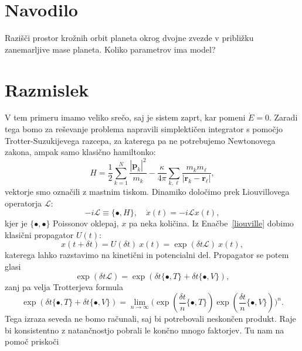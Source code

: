\documentclass[12pt, a4paper]{article}
\renewcommand{\r}{
    \ensuremath{\mathbf{r}}
}
\newcommand{\p}{
    \ensuremath{\mathbf{p}}
}
\renewcommand{\L}{
    \ensuremath{\mathcal{L}}
}
\newcommand{\sfrac}[2]{
    \ensuremath{\textstyle{\frac{#1}{#2}}}
}
\begin{document}
\section{Navodilo}

Razi\v s\v ci prostor kro\v znih orbit planeta okrog dvojne zvezde v pribli\v zku zanemarljive mase
planeta. Koliko parametrov ima model?

\section{Razmislek}

V tem primeru imamo veliko sre\v co, saj je sistem zaprt, kar pomeni $\dot{E} = 0$. Zaradi tega bomo
za re\v sevanje problema napravili simplekti\v cen integrator s pomo\v cjo Trotter-Suzukijevega
razcepa, za katerega pa ne potrebujemo Newtonovega zakona, ampak samo klasi\v cno hamiltonko:
\begin{equation}
    H = \frac{1}{2}\sum_{k = 1}^N \frac{|\p_k|^2}{m_k} - \frac{\kappa}{4\pi}\sum_{k,\ell}
        \frac{m_k m_\ell}{|\r_k - \r_\ell|},
    \label{hamilton}
\end{equation}
vektorje smo ozna\v cili z mastnim tiskom. Dinamiko dolo\v cimo prek Liouvillovega operatorja $\L$:
\begin{equation}
    -i\L \equiv \{\bullet, H\}, \quad \dot{x}(t) = -i\L x(t),
    \label{liouville}
\end{equation}
kjer je $\{\bullet, \bullet\}$ Poissonov oklepaj, $x$ pa neka koli\v cina. Iz Ena\v cbe~\eqref{liouville}
dobimo klasi\v cni propagator $U(t)$:
\begin{equation}
    x(t + \delta t) = U(\delta t)\ x(t) = \exp(\delta t\L)\ x(t),
\end{equation}
katerega lahko razstavimo na kineti\v cni in potencialni del. Propagator se potem glasi
\begin{equation}
    \exp(\delta t \L) = \exp(\delta t \{\bullet, T\} + \delta t \{\bullet, V\}),
    \label{propagator}
\end{equation}
zanj pa velja Trotterjeva formula
\begin{equation}
    \exp(\delta t\{\bullet,T\} + \delta t\{\bullet,V\}) = \lim_{n \to \infty}
        \Big(\exp(\sfrac{\delta t}{n}\{\bullet,T\})\exp(\sfrac{\delta t}{n}\{\bullet,V\})\Big)^n.
\end{equation}
Tega izraza seveda ne bomo ra\v cunali, saj bi potrebovali neskon\v cen produkt. Raje bi konsistentno z
natan\v cnostjo pobrali le kon\v cno mnogo faktorjev. Tu nam na pomo\v c prisko\v ci
\end{document}
